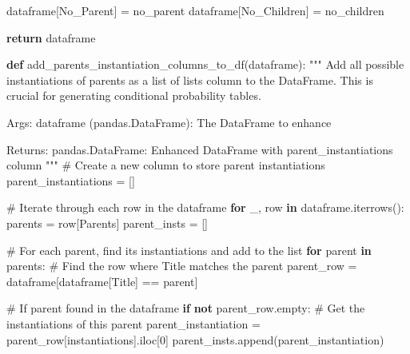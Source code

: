 \documentclass[
  11pt,
  letterpaper,
  openany]{book}
\newenvironment{Shaded}{\begin{snugshade}}{\end{snugshade}}
\newcommand{\CommentTok}[1]{\textcolor[rgb]{0.37,0.37,0.37}{#1}}
\newcommand{\ControlFlowTok}[1]{\textcolor[rgb]{0.00,0.23,0.31}{\textbf{#1}}}
\newcommand{\DecValTok}[1]{\textcolor[rgb]{0.68,0.00,0.00}{#1}}
\newcommand{\KeywordTok}[1]{\textcolor[rgb]{0.00,0.23,0.31}{\textbf{#1}}}
\newcommand{\NormalTok}[1]{\textcolor[rgb]{0.00,0.23,0.31}{#1}}
\newcommand{\OperatorTok}[1]{\textcolor[rgb]{0.37,0.37,0.37}{#1}}
\newcommand{\StringTok}[1]{\textcolor[rgb]{0.13,0.47,0.30}{#1}}
\begin{document}
\begin{landscape}
\begin{Shaded}
\begin{Highlighting}[]
\NormalTok{    dataframe[}\StringTok{\textquotesingle{}No\_Parent\textquotesingle{}}\NormalTok{] }\OperatorTok{=}\NormalTok{ no\_parent}
\NormalTok{    dataframe[}\StringTok{\textquotesingle{}No\_Children\textquotesingle{}}\NormalTok{] }\OperatorTok{=}\NormalTok{ no\_children}

    \ControlFlowTok{return}\NormalTok{ dataframe}

\KeywordTok{def}\NormalTok{ add\_parents\_instantiation\_columns\_to\_df(dataframe):}
    \CommentTok{"""}
\CommentTok{    Add all possible instantiations of parents as a list of lists column}
\CommentTok{    to the DataFrame.}
\CommentTok{    This is crucial for generating conditional probability tables.}

\CommentTok{    Args:}
\CommentTok{        dataframe (pandas.DataFrame): The DataFrame to enhance}

\CommentTok{    Returns:}
\CommentTok{        pandas.DataFrame: Enhanced DataFrame with parent\_instantiations column}
\CommentTok{    """}
    \CommentTok{\# Create a new column to store parent instantiations}
\NormalTok{    parent\_instantiations }\OperatorTok{=}\NormalTok{ []}

    \CommentTok{\# Iterate through each row in the dataframe}
    \ControlFlowTok{for}\NormalTok{ \_, row }\KeywordTok{in}\NormalTok{ dataframe.iterrows():}
\NormalTok{        parents }\OperatorTok{=}\NormalTok{ row[}\StringTok{\textquotesingle{}Parents\textquotesingle{}}\NormalTok{]}
\NormalTok{        parent\_insts }\OperatorTok{=}\NormalTok{ []}

        \CommentTok{\# For each parent, find its instantiations and add to the list}
        \ControlFlowTok{for}\NormalTok{ parent }\KeywordTok{in}\NormalTok{ parents:}
            \CommentTok{\# Find the row where Title matches the parent}
\NormalTok{            parent\_row }\OperatorTok{=}\NormalTok{ dataframe[dataframe[}\StringTok{\textquotesingle{}Title\textquotesingle{}}\NormalTok{] }\OperatorTok{==}\NormalTok{ parent]}

            \CommentTok{\# If parent found in the dataframe}
            \ControlFlowTok{if} \KeywordTok{not}\NormalTok{ parent\_row.empty:}
                \CommentTok{\# Get the instantiations of this parent}
\NormalTok{                parent\_instantiation }\OperatorTok{=}\NormalTok{ parent\_row[}\StringTok{\textquotesingle{}instantiations\textquotesingle{}}\NormalTok{].iloc[}\DecValTok{0}\NormalTok{]}
\NormalTok{                parent\_insts.append(parent\_instantiation)}


\end{Highlighting}
\end{Shaded}
\end{landscape}
\end{document}
